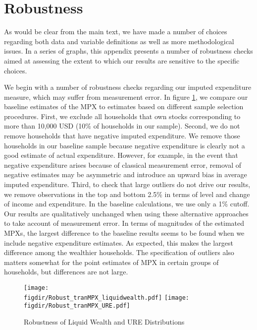 \documentclass[titlepage]{\econtex}\newcommand{\texname}{ConsumptionHeterogeneity}
\newcommand{\figdir}{../Code/Rcode/Figures/AEJ_revision}
\begin{document}
	\section{Robustness} \label{robustness}
	As would be clear from the main text, we have made a number of choices regarding both data and variable definitions as well as more methodological issues. In a series of graphs, this appendix presents a number of robustness checks aimed at assessing the extent to which our results are sensitive to the specific choices. 
	
	We begin with a number of robustness checks regarding our imputed expenditure measure, which may suffer from measurement error. In figure \ref{fig:Robust_liquidURE}, we compare our baseline estimates of the MPX to estimates based on different sample selection procedures. First, we exclude all households that own stocks corresponding to more than 10,000 USD (10\% of households in our sample). Second, we do not remove households that have negative imputed expenditure. We remove those households in our baseline sample because negative expenditure is clearly not a good estimate of actual expenditure. However, for example, in the event that negative expenditure arises because of classical measurement error, removal of negative estimates may be asymmetric and introduce an upward bias in average imputed expenditure. Third, to check that large outliers do not drive our results, we remove observations in the top and bottom 2.5\% in terms of level and change of income and expenditure. In the baseline calculations, we use only a 1\% cutoff. Our results are qualitatively unchanged when using these alternative approaches to take account of measurement error. In terms of magnitudes of the estimated MPXs, the largest difference to the baseline results seems to be found when we include negative expenditure estimates. As expected, this makes the largest difference among the wealthier households. The specification of outliers also matters somewhat for the point estimates of MPX in certain groups of households, but differences are not large. 
	
	\begin{figure}
		\begin{centering}
			\texttt{[image: \\figdir/Robust\_tranMPX\_liquidwealth.pdf]}
			\texttt{[image: \\figdir/Robust\_tranMPX\_URE.pdf]}
			\caption{Robustness of Liquid Wealth and URE Distributions}
			\label{fig:Robust_liquidURE}
		\end{centering}
	\end{figure}
	
\end{document}
